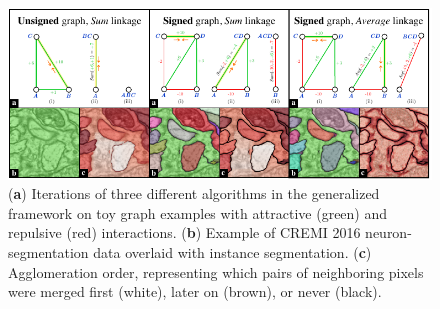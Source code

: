 \begin{figure}[t]
\centering
\includegraphics[width=\textwidth]{./figs/intro_image.pdf} %
\caption{
 (\textbf{a}) Iterations of three different algorithms in the generalized framework on  toy graph examples with attractive (green) and repulsive (red) interactions. (\textbf{b}) Example of CREMI 2016 neuron-segmentation data \cite{cremiChallenge} overlaid with instance segmentation. (\textbf{c}) Agglomeration order, representing which pairs of neighboring pixels were merged first (white), later on (brown), or never (black).
\label{fig:intro_figure}}
\end{figure}
